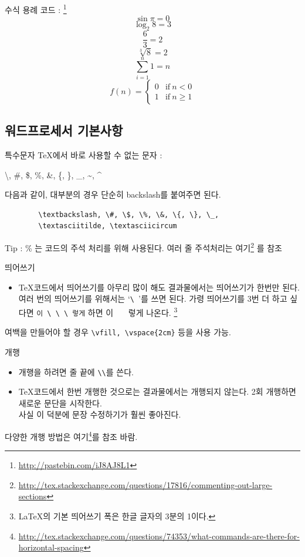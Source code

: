 \documentclass[12pt]{beamer}
\begin{document}
\begin{frame}{수식 용례}
	코드 : \footnote{\url{http://pastebin.com/iJ8AJ8L1}}
	\[ \sin{\pi} = 0 \]
	\[ \log_{2}{8} = 3 \]
	\[ \frac{6}{3} = 2 \]
	\[ \sqrt[3]{8} = 2 \]
	\[ \sum_{i=1}^{n}{1} = n \]
	\begin{equation}
		f(n) =
		\begin{cases}
			0 & \text{if}\ n < 0 \\ 
			1 & \text{if}\ n \geq 1
		\end{cases}
	\end{equation}
\end{frame}
\subsection{워드프로세서 기본사항}
\begin{frame}[fragile]{특수문자}
	\TeX 에서 바로 사용할 수 없는 문자 : 
	\begin{center}
		\textbackslash, \#, \$, \%, \&, \{, \}, \_, \textasciitilde, 
		\textasciicircum
	\end{center}
	다음과 같이, 대부분의 경우 단순히 backslash를 붙여주면 된다.
	\begin{verbatim}
		\textbackslash, \#, \$, \%, \&, \{, \}, \_,
		\textasciitilde, \textasciicircum
	\end{verbatim}
	Tip : \% 는 코드의 주석 처리를 위해 사용된다. 여러 줄 주석처리는 여기\footnote{\url{http://tex.stackexchange.com/questions/17816/commenting-out-large-sections}} 를 참조
\end{frame}
\begin{frame}[fragile]{띄어쓰기}
	\begin{itemize}
		\item \TeX 코드에서 띄어쓰기를 아무리 많이 해도 결과물에서는 
		띄어쓰기가 한번만 된다. \\
		여러 번의 띄어쓰기를 위해서는 `\verb|\ |'를 쓰면 된다.
		가령 띄어쓰기를 3번 더 하고 싶다면 \verb|이 \ \ \ 렇게| 하면
		이 \ \ \ 렇게 나온다.
		\footnote{\LaTeX 의 기본 띄어쓰기 폭은 한글 글자의 3분의 1이다.}
	\end{itemize}
	여백을 만들어야 할 경우 \verb|\vfill, \vspace{2cm}| 등을 사용 가능.
\end{frame}
\begin{frame}[fragile]{개행}
	\begin{itemize}
		\item 개행을 하려면 줄 끝에 \verb|\\|를 쓴다.
		\item \TeX 코드에서 한번 개행한 것으로는 결과물에서는 개행되지 
		않는다. 2회 개행하면 새로운 문단을 시작한다. \\
		사실 이 덕분에 문장 수정하기가 훨씬 좋아진다. 
	\end{itemize}
	다양한 개행 방법은 여기\footnote{\url{http://tex.stackexchange.com/questions/74353/what-commands-are-there-for-horizontal-spacing}}를 참조 바람.
\end{frame}
\end{document}
